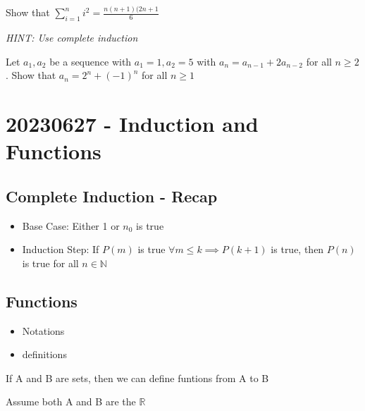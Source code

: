 \documentclass{report}
\begin{document}
     {
      Show that $\sum^{n}_{i=1} i^2 = \frac{n(n+1)(2n+1}{6} $
    }
     {
      \emph{HINT:  Use complete induction}

      Let $a_1, a_2$ be a sequence with $a_1=1, a_2=5$ with
      $a_n = a_{n-1}+2a_{n-2}$ for all $n \geq2$.  Show that
      $a_n = 2^n+(-1)^n$ for all $n \geq 1$
    }
\section*{20230627 - Induction and Functions}%
  \subsection*{Complete Induction - Recap}%
  \begin{itemize}
    \item Base Case: Either 1 or $n_0$ is true
    \item Induction Step: If $P(m)$ is true $\forall m \leq k \implies
      P(k+1)$ is true, then $P(n)$ is true for all $n \in \mathbb{N}$
       {
        
      }
  \end{itemize}

  \subsection*{Functions}%
    \begin{itemize} Plan
      \item  Notations
      \item definitions
    \end{itemize}

    If A and B are sets, then we can define funtions from A to B

    Assume both A and B are the $\mathbb{R}$

\end{document}
